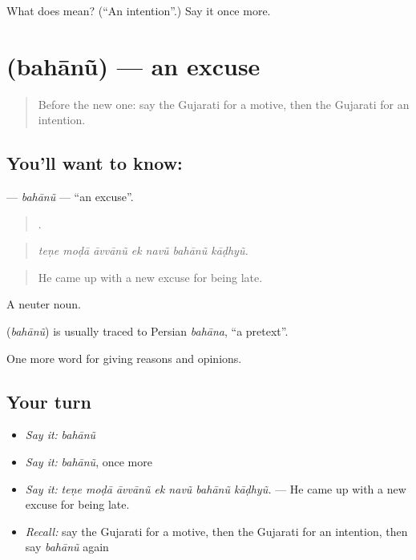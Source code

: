 \begin{tcolorbox}[breakable,colback=teal!4,colframe=teal!35!black,title={Before you move on}]
What does  mean? (\textquotedblleft{}An intention\textquotedblright{}.) Say it once more.
\end{tcolorbox}
\section[\texorpdfstring{\gu{બહાનું} (bahānũ)}{બહાનું (bahānũ)}]{ (bahānũ) — an excuse}

\label{lesson:GU-C340-bahanu}



\begin{quote}
Before the new one: say the Gujarati for a motive, then the Gujarati for an intention.
\end{quote}

\subsection*{You'll want to know: }
\textbf{} — \emph{bahānũ} — \textquotedblleft{}an excuse\textquotedblright{}.

\begin{quote}
      .
\end{quote}

\begin{quote}
\emph{teṇe moḍā āvvānũ ek navũ bahānũ kāḍhyũ.}
\end{quote}

\begin{quote}
He came up with a new excuse for being late.
\end{quote}

A neuter noun.

\begin{cousinweb}
\textbf{} (\emph{bahānũ}) is usually traced to Persian \emph{bahāna}, \textquotedblleft{}a pretext\textquotedblright{}.
\end{cousinweb}

\begin{grammarlens}[title={What you've built}]
One more word for giving reasons and opinions.
\end{grammarlens}

\subsection*{Your turn}
\begin{itemize}
\raggedright
  \item \emph{Say it:} \emph{bahānũ}
  \item \emph{Say it:} \emph{bahānũ}, once more
  \item \emph{Say it:} \emph{teṇe moḍā āvvānũ ek navũ bahānũ kāḍhyũ.} — He came up with a new excuse for being late.
  \item \emph{Recall:} say the Gujarati for a motive, then the Gujarati for an intention, then say \emph{bahānũ} again
\end{itemize}

